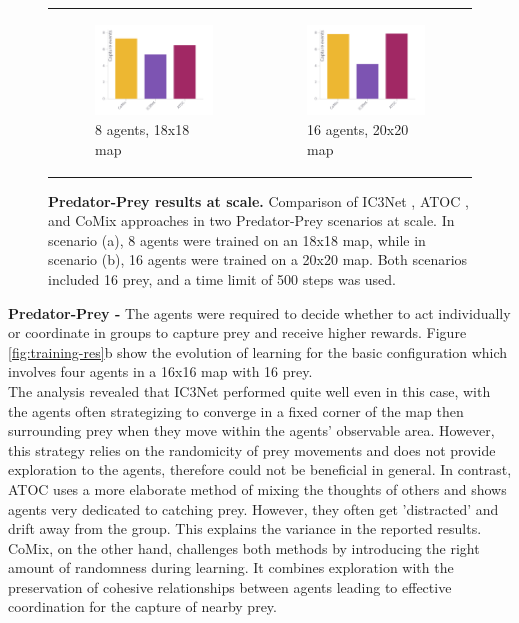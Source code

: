\documentclass[a4paper,singleside,12pt]{report} %
\begin{document}
\begin{figure}
  \centering
  \begin{tabular}{p{4.5cm} p{4.5cm}}
  \begin{subfigure}[b]{5cm}
      \caption{8 agents, 18x18 map}
      \includegraphics[width=5cm]{images/train_pursuit8.png}
  \end{subfigure} &
  \begin{subfigure}[b]{5cm}
      \caption{16 agents, 20x20 map}
      \includegraphics[width=5cm]{images/train_pursuit16.png}
  \end{subfigure} \\
  \end{tabular}
  \caption{\textbf{Predator-Prey results at scale.}  Comparison of IC3Net \cite{IC3NETSingh2018LearningWT}, ATOC \cite{ATOCJiang2018LearningAC}, and CoMix approaches in two Predator-Prey scenarios at scale. In scenario (a), 8 agents were trained on an 18x18 map, while in scenario (b), 16 agents were trained on a 20x20 map. Both scenarios included 16 prey, and a time limit of 500 steps was used.}
  \label{fig:training-res-scale}
\end{figure}

\textbf{Predator-Prey - } The agents were required to decide whether to act individually or coordinate in groups to capture prey and receive higher rewards. Figure \ref{fig:training-res}b show the evolution of learning for the basic configuration which involves four agents in a 16x16 map with 16 prey.\\
The analysis revealed that IC3Net performed quite well even in this case, with the agents often strategizing to converge in a fixed corner of the map then surrounding prey when they move within the agents' observable area. However, this strategy relies on the randomicity of prey movements and does not provide exploration to the agents, therefore could not be beneficial in general. In contrast, ATOC uses a more elaborate method of mixing the thoughts of others and shows agents very dedicated to catching prey. However, they often get 'distracted' and drift away from the group. This explains the variance in the reported results. CoMix, on the other hand, challenges both methods by introducing the right amount of randomness during learning. It combines exploration with the preservation of cohesive relationships between agents leading to effective coordination for the capture of nearby prey.
\end{document}
